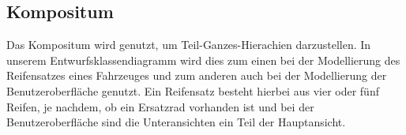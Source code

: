 \subsection{Kompositum}
Das Kompositum wird genutzt, um Teil-Ganzes-Hierachien darzustellen. In unserem Entwurfsklassendiagramm wird dies zum einen bei der Modellierung des Reifensatzes eines Fahrzeuges und zum anderen auch bei der Modellierung der Benutzeroberfläche genutzt. Ein Reifensatz besteht hierbei aus vier oder fünf Reifen, je nachdem, ob ein Ersatzrad vorhanden ist und bei der Benutzeroberfläche sind die Unteransichten ein Teil der Hauptansicht.